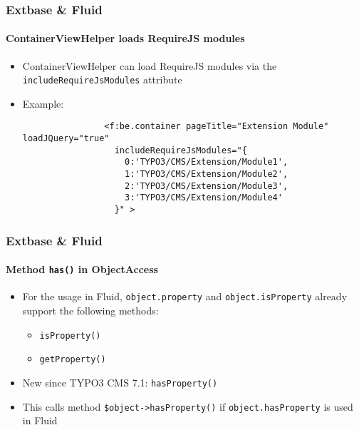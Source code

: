 \begin{frame}[fragile]
	\frametitle{Extbase \& Fluid}
	\framesubtitle{ContainerViewHelper loads RequireJS modules}

	\begin{itemize}

		\item ContainerViewHelper can load RequireJS modules via the \texttt{includeRequireJsModules} attribute

		\item Example:

			\begin{lstlisting}
				<f:be.container pageTitle="Extension Module" loadJQuery="true"
				  includeRequireJsModules="{
				    0:'TYPO3/CMS/Extension/Module1',
				    1:'TYPO3/CMS/Extension/Module2',
				    2:'TYPO3/CMS/Extension/Module3',
				    3:'TYPO3/CMS/Extension/Module4'
				  }" >
			\end{lstlisting}

	\end{itemize}

\end{frame}


\begin{frame}[fragile]
	\frametitle{Extbase \& Fluid}
	\framesubtitle{Method \texttt{has()} in ObjectAccess}

	\begin{itemize}

		\item For the usage in Fluid, \texttt{object.property} and \texttt{object.isProperty} already
			support the following methods:

			\begin{itemize}
				\item \texttt{isProperty()}
				\item \texttt{getProperty()}
			\end{itemize}

		\item New since TYPO3 CMS 7.1: \texttt{hasProperty()}
		\item This calls method \texttt{\$object->hasProperty()}\newline
			if \texttt{object.hasProperty} is used in Fluid

	\end{itemize}

\end{frame}

